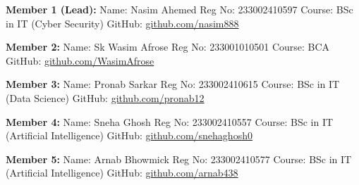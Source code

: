 \documentclass[a4paper,14pt]{article}
\begin{document}
\begin{multicols}{2}

    \begin{tcolorbox}[colframe=black, colback=white, sharp corners=southwest, boxrule=0.5mm, arc=5mm]
    \textbf{Member 1 (Lead):} \newline
    Name: Nasim Ahemed \newline
    Reg No: 233002410597 \newline
    Course: BSc in IT (Cyber Security) \newline
    GitHub: \href{https://github.com/nasim888}{github.com/nasim888}
    \end{tcolorbox}

    \begin{tcolorbox}[colframe=black, colback=white, sharp corners=southwest, boxrule=0.5mm, arc=5mm]
    \textbf{Member 2:} \newline
    Name: Sk Wasim Afrose \newline
    Reg No: 233001010501 \newline
    Course: BCA \newline
    GitHub: \href{https://github.com/WasimAfrose}{github.com/WasimAfrose}
    \end{tcolorbox}

    \begin{tcolorbox}[colframe=black, colback=white, sharp corners=southwest, boxrule=0.5mm, arc=5mm]
    \textbf{Member 3:} \newline
    Name: Pronab Sarkar \newline
    Reg No: 233002410615 \newline
    Course: BSc in IT (Data Science) \newline
    GitHub: \href{https://github.com/pronab12}{github.com/pronab12}
    \end{tcolorbox}

    \columnbreak

    \begin{tcolorbox}[colframe=black, colback=white, sharp corners=southwest, boxrule=0.5mm, arc=5mm]
    \textbf{Member 4:} \newline
    Name: Sneha Ghosh \newline
    Reg No: 233002410557 \newline
    Course: BSc in IT (Artificial Intelligence) \newline
    GitHub: \href{https://github.com/snehaghosh0}{github.com/snehaghosh0}
    \end{tcolorbox}

    \begin{tcolorbox}[colframe=black, colback=white, sharp corners=southwest, boxrule=0.5mm, arc=5mm]
    \textbf{Member 5:} \newline
    Name: Arnab Bhowmick \newline
    Reg No: 233002410577 \newline
    Course: BSc in IT (Artificial Intelligence) \newline
    GitHub: \href{https://github.com/arnab438}{github.com/arnab438}
    \end{tcolorbox}

\end{multicols}
\newpage
\end{document}
